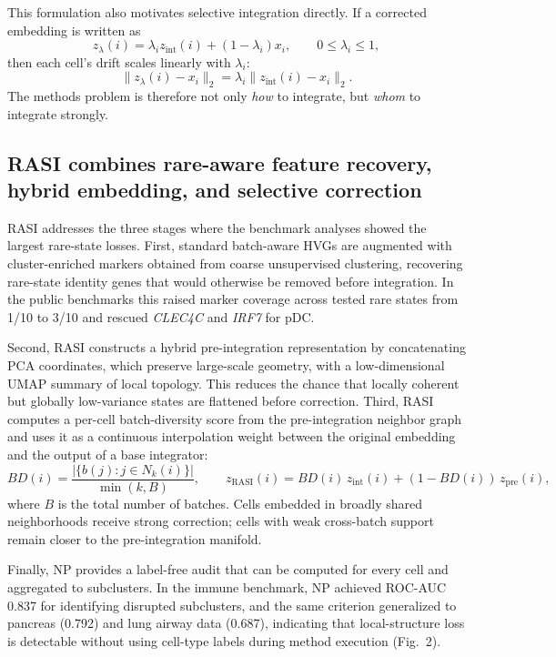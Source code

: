 \documentclass[10pt]{article}
\begin{document}
This formulation also motivates selective integration directly. If a corrected embedding is written as
\begin{equation}
z_{\lambda}(i) = \lambda_i z_{\mathrm{int}}(i) + (1-\lambda_i)x_i,
\qquad 0 \leq \lambda_i \leq 1,
\end{equation}
then each cell's drift scales linearly with $\lambda_i$:
\begin{equation}
\|z_{\lambda}(i)-x_i\|_2 = \lambda_i \|z_{\mathrm{int}}(i)-x_i\|_2.
\end{equation}
The methods problem is therefore not only \emph{how} to integrate, but \emph{whom} to integrate strongly.

\subsection*{RASI combines rare-aware feature recovery, hybrid embedding, and selective correction}

RASI addresses the three stages where the benchmark analyses showed the largest rare-state losses. First, standard batch-aware HVGs are augmented with cluster-enriched markers obtained from coarse unsupervised clustering, recovering rare-state identity genes that would otherwise be removed before integration. In the public benchmarks this raised marker coverage across tested rare states from 1/10 to 3/10 and rescued \textit{CLEC4C} and \textit{IRF7} for pDC.

Second, RASI constructs a hybrid pre-integration representation by concatenating PCA coordinates, which preserve large-scale geometry, with a low-dimensional UMAP summary of local topology.\cite{mcinnes2018} This reduces the chance that locally coherent but globally low-variance states are flattened before correction. Third, RASI computes a per-cell batch-diversity score from the pre-integration neighbor graph and uses it as a continuous interpolation weight between the original embedding and the output of a base integrator:
\begin{equation}
BD(i) = \frac{|\{b(j): j \in N_k(i)\}|}{\min(k,B)},
\qquad
z_{\mathrm{RASI}}(i) = BD(i)\, z_{\mathrm{int}}(i) + (1-BD(i))\, z_{\mathrm{pre}}(i),
\end{equation}
where $B$ is the total number of batches. Cells embedded in broadly shared neighborhoods receive strong correction; cells with weak cross-batch support remain closer to the pre-integration manifold.

Finally, NP provides a label-free audit that can be computed for every cell and aggregated to subclusters. In the immune benchmark, NP achieved ROC-AUC 0.837 for identifying disrupted subclusters, and the same criterion generalized to pancreas (0.792) and lung airway data (0.687), indicating that local-structure loss is detectable without using cell-type labels during method execution (Fig.~2).
\end{document}
